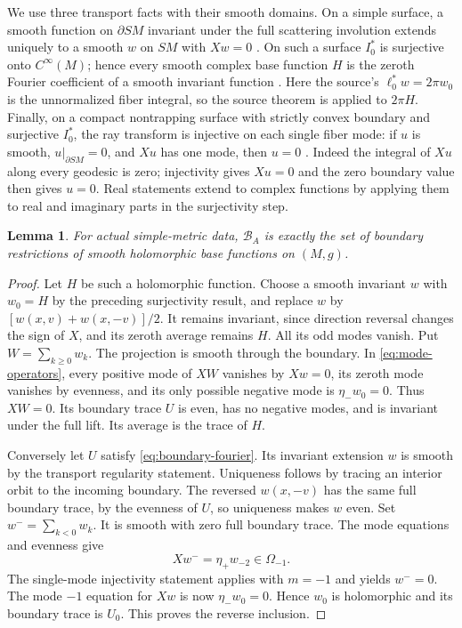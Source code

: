 \documentclass[11pt]{article}
\newtheorem{lemma}[theorem]{Lemma}
\theoremstyle{remark}
\newcommand{\BA}{\mathcal B_A}
\begin{document}
We use three transport facts with their smooth domains. On a simple
surface, a smooth function on $\partial SM$ invariant under the full
scattering involution extends uniquely to a smooth $w$ on $SM$ with
$Xw=0$ \cite[Theorem~5.1.1]{PSU}. On such a surface $I_0^*$ is
surjective onto $C^\infty(M)$; hence every smooth complex base function
$H$ is the zeroth Fourier coefficient of a smooth invariant function
\cite[Theorems~8.2.1 and 8.2.2]{PSU}. Here the source's
$\ell_0^*w=2\pi w_0$ is the unnormalized fiber integral, so the
source theorem is applied to $2\pi H$. Finally, on a compact nontrapping
surface with strictly convex boundary and surjective $I_0^*$, the ray
transform is injective on each single fiber mode: if $u$ is smooth,
$u|_{\partial SM}=0$, and $Xu$ has one mode, then $u=0$
\cite[Theorem~10.2.3]{PSU}. Indeed the integral of $Xu$ along every
geodesic is zero; injectivity gives $Xu=0$ and the zero boundary value
then gives $u=0$. Real statements extend to complex functions by applying
them to real and imaginary parts in the surjectivity step.

\begin{lemma}\label{lem:traces}
For actual simple-metric data, $\BA$ is exactly the set of boundary
restrictions of smooth holomorphic base functions on $(M,g)$.
\end{lemma}
\begin{proof}
Let $H$ be such a holomorphic function. Choose a smooth invariant $w$
with $w_0=H$ by the preceding surjectivity result, and replace $w$ by
$[w(x,v)+w(x,-v)]/2$. It remains invariant, since direction reversal
changes the sign of $X$, and its zeroth average remains $H$.
All its odd modes vanish. Put $W=\sum_{k\ge0}w_k$.
The projection is smooth through the boundary. In \eqref{eq:mode-operators},
every positive mode of $XW$ vanishes by $Xw=0$, its zeroth mode vanishes
by evenness, and its only possible negative mode is $\eta_-w_0=0$.
Thus $XW=0$. Its boundary trace $U$ is even, has no negative modes,
and is invariant under the full lift. Its average is the trace of $H$.

Conversely let $U$ satisfy \eqref{eq:boundary-fourier}. Its invariant
extension $w$ is smooth by the transport regularity statement.
Uniqueness follows by tracing an interior orbit to the incoming boundary.
The reversed $w(x,-v)$ has the same full boundary trace, by the evenness
of $U$, so uniqueness makes $w$ even. Set $w^- =\sum_{k<0}w_k$.
It is smooth with zero full boundary trace. The mode equations and
evenness give
\[
 Xw^-=\eta_+w_{-2}\in\Omega_{-1}.
\]
The single-mode injectivity statement applies with $m=-1$ and yields
$w^-=0$. The mode $-1$ equation for $Xw$ is now
$\eta_-w_0=0$. Hence $w_0$ is holomorphic and its boundary trace is
$U_0$. This proves the reverse inclusion.
\end{proof}
\end{document}
